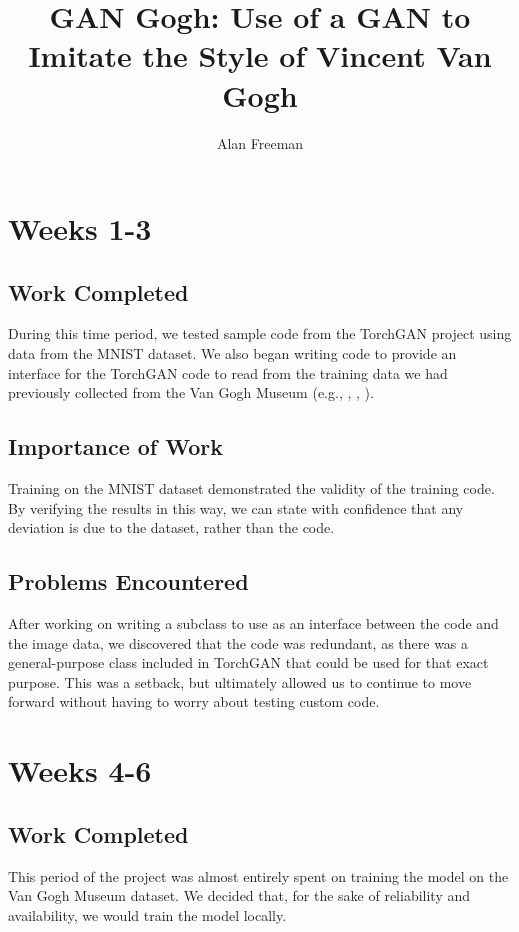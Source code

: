 \documentclass[12pt,letterpaper]{article}
\author{Alan Freeman}
\title{GAN Gogh: Use of a GAN to Imitate the Style of Vincent Van Gogh}
\begin{document}
	\maketitle
	
	
	\section{Weeks 1-3}
	\subsection{Work Completed}
	During this time period, we tested sample code from the TorchGAN\cite{pal2019torchgan} project using data from the MNIST\cite{lecun2010mnist} dataset.
	We also began writing code to provide an interface for the TorchGAN code to read from the training data we had previously collected from the Van Gogh Museum (e.g., \cite{001}, \cite{002}, \cite{003}).
	
	\subsection{Importance of Work}
	Training on the MNIST dataset demonstrated the validity of the training code. 
	By verifying the results in this way, we can state with confidence that any deviation is due to the dataset, rather than the code.
	
	\subsection{Problems Encountered}
	After working on writing a subclass to use as an interface between the code and the image data, we discovered that the code was redundant, as there was a general-purpose class included in TorchGAN that could be used for that exact purpose. This was a setback, but ultimately allowed us to continue to move forward without having to worry about testing custom code.

	\section{Weeks 4-6}
	\subsection{Work Completed}
	This period of the project was almost entirely spent on training the model on the Van Gogh Museum dataset. We decided that, for the sake of reliability and availability, we would train the model locally.
\end{document}
